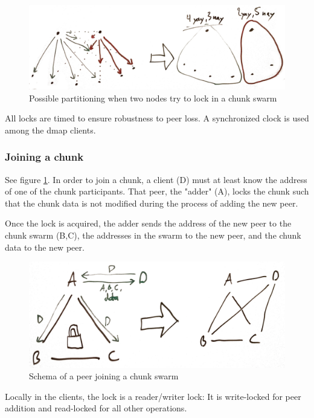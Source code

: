 \documentclass[a4paper, 10pt, conference]{ieeeconf}
\begin{document}
\begin{figure}[H]
  \centering
  \includegraphics[width=\linewidth]{lock-partition.jpg}
  \caption{Possible partitioning when two nodes try to lock in a chunk swarm}
\end{figure}

All locks are timed to ensure robustness to peer loss. A synchronized clock is
used among the dmap clients.

\subsubsection{Joining a chunk}
See figure \ref{fig:join}.
In order to join a chunk, a client (D) must at least know the address of one of
the chunk participants. That peer, the "adder" (A), locks the chunk such that
the chunk
data is not modified during the process of adding the new peer.

Once the lock is acquired, the adder sends the address of the new peer to the
chunk swarm (B,C), the addresses in the swarm to the new peer, and the chunk 
data to the new peer.

\begin{figure}[H]
  \centering
  \includegraphics[width=\linewidth]{joining.jpg}
  \caption{Schema of a peer joining a chunk swarm}
  \label{fig:join}
\end{figure}

Locally in the clients, the lock is a reader/writer lock: It is write-locked
for peer addition and read-locked for all other operations.
\end{document}
